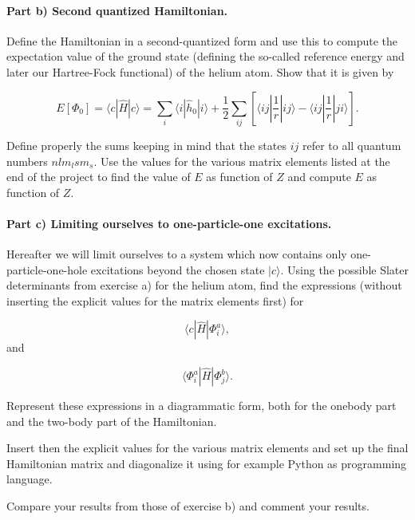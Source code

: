 \documentclass[%
oneside,                 %
final,                   %
10pt]{article}
\begin{document}
\paragraph{Part b) Second quantized Hamiltonian.}
Define the Hamiltonian in a second-quantized form and use this to
compute the expectation value of the ground state (defining the
so-called reference energy and later our Hartree-Fock functional) of
the helium atom.  Show that it is given by

\begin{equation*}
  E[\Phi_0] = \langle c | \hat{H}| c \rangle 
  = \sum_{i} \langle i | \hat{h}_0 | i\rangle+ \frac{1}{2}\sum_{ij}\left[\langle ij |\frac{1}{r}|ij\rangle-\langle ij |\frac{1}{r}|ji\rangle\right].
\end{equation*}

Define properly the sums keeping in mind that the states $ij$ refer to
all quantum numbers $nlm_lsm_s$.  Use the values for the various
matrix elements listed at the end of the project to find the value of
$E$ as function of $Z$ and compute $E$ as function of $Z$.

\paragraph{Part c) Limiting ourselves to one-particle-one excitations.}
Hereafter we will limit ourselves to a system which now contains only
one-particle-one-hole excitations beyond the chosen state $|c\rangle$.
Using the possible Slater determinants from exercise a) for the helium
atom, find the expressions (without inserting the explicit values for
the matrix elements first) for

\begin{equation*}
\langle c | \hat{H}| \Phi_i^a \rangle,
\end{equation*}
and

\begin{equation*}
\langle \Phi_i^a | \hat{H}| \Phi_j^b \rangle.
\end{equation*}

Represent these expressions in a diagrammatic form, both for the
onebody part and the two-body part of the Hamiltonian.

Insert then the explicit values for the various matrix elements and
set up the final Hamiltonian matrix and diagonalize it using for
example Python as programming language. 

Compare your results from those of exercise b) and comment your results. 
\end{document}
